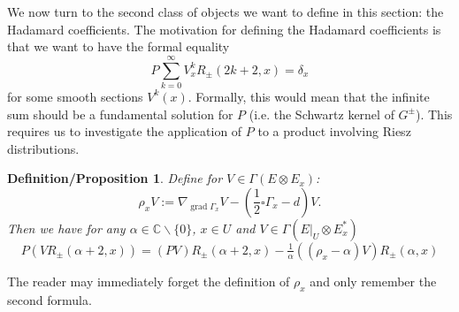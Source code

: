 \documentclass[11pt]{article}
\def\C{{\mathbb{C}}}
\def\insum#1{\sum\limits_{#1=0}^\infty}
\def\O {\backslash \{0\}}
\newtheorem{defprop}[df]{Definition/Proposition}
\DeclareMathOperator{\grad}{grad}
\begin{document}
We now turn to the second class of objects we want to define in this section: the Hadamard coefficients.
The motivation for defining the Hadamard coefficients is that we want to have the formal equality
\[P\insum{k}V^{k}_x R_\pm(2k+2,x)=\delta_x\]
for some smooth sections $V^{k}(x)$. Formally, this would mean that the infinite sum should be a fundamental solution for $P$ (i.e. the Schwartz kernel of $G^\pm$). This requires us to investigate the application of $P$ to a product involving Riesz distributions.
\begin{defprop}
	\label{dfrho}
	\label{Prho}
	Define for $V\in \Gamma(E\otimes E_x)$:
	\[\rho_x V:= \nabla_{\grad\Gamma_x}V-\left(\frac{1}{2}\square\Gamma_x-d\right)V.\]
	Then we have for any $\alpha\in \C\O$, $x\in U$ and $V\in \Gamma(E|_U\otimes E^*_x)$
	\[P(VR_\pm(\alpha+2,x))=(PV)R_\pm(\alpha+2,x)-\tfrac{1}{\alpha}((\rho_x-\alpha)V)R_\pm(\alpha,x)\]
\end{defprop}
The reader may immediately forget the definition of $\rho_x$ and only remember the second formula.
\end{document}

